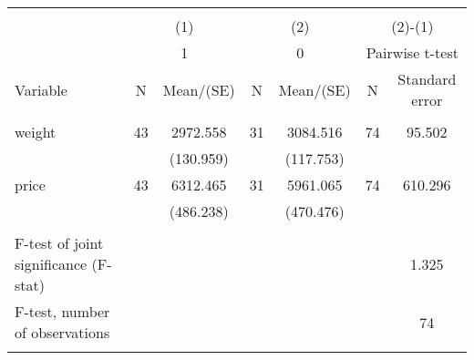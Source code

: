 
\begin{tabular}{@{\extracolsep{5pt}}lcccccc}
\\[-1.8ex]\hline \hline \\[-1.8ex]
 & \multicolumn{2}{c}{(1)}  & \multicolumn{2}{c}{(2)}  & \multicolumn{2}{c}{(2)-(1)} \\
 & \multicolumn{2}{c}{1}  & \multicolumn{2}{c}{0}  & \multicolumn{2}{c}{Pairwise t-test}  \\
Variable & N & Mean/(SE) & N & Mean/(SE) & N & Standard error \\ \hline \\[-1.8ex] 
weight   & 43    & 2972.558    & 31    & 3084.516    & 74    & 95.502   \\
 &   & (130.959)  &   & (117.753)  &   &  \\ [1ex]
price   & 43    & 6312.465    & 31    & 5961.065    & 74    & 610.296   \\
 &   & (486.238)  &   & (470.476)  &   &  \\ [1ex]
\hline \\[-1.8ex]
F-test of joint significance (F-stat) & &   & &     & &  1.325  \\
F-test, number of observations & &   & &   & &  74  \\
\hline \hline \\[-1.8ex]

\end{tabular}
